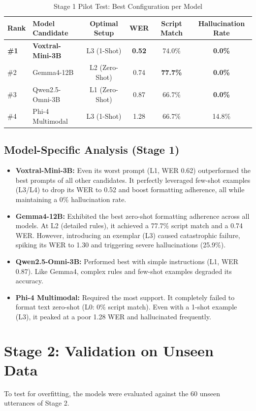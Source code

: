 \documentclass[12pt]{article}
\begin{document}
\begin{table}[H]
\centering
\caption{Stage 1 Pilot Test: Best Configuration per Model}
\begin{tabularx}{\textwidth}{@{} l X c c c c @{}}
\toprule
\textbf{Rank} & \textbf{Model Candidate} & \textbf{Optimal Setup} & \textbf{WER} & \textbf{Script Match} & \textbf{Hallucination Rate} \\
\midrule
\textbf{\#1} & \textbf{Voxtral-Mini-3B} & L3 (1-Shot) & \textbf{0.52} & 74.0\% & \textbf{0.0\%} \\
\#2 & Gemma4-12B & L2 (Zero-Shot) & 0.74 & \textbf{77.7\%} & \textbf{0.0\%} \\
\#3 & Qwen2.5-Omni-3B & L1 (Zero-Shot) & 0.87 & 66.7\% & \textbf{0.0\%} \\
\#4 & Phi-4 Multimodal & L3 (1-Shot) & 1.28 & 66.7\% & 14.8\% \\
\bottomrule
\end{tabularx}
\end{table}

\subsection{Model-Specific Analysis (Stage 1)}
\begin{itemize}
    \item \textbf{Voxtral-Mini-3B:} Even its worst prompt (L1, WER 0.62) outperformed the best prompts of all other candidates. It perfectly leveraged few-shot examples (L3/L4) to drop its WER to 0.52 and boost formatting adherence, all while maintaining a 0\% hallucination rate.
    \item \textbf{Gemma4-12B:} Exhibited the best zero-shot formatting adherence across all models. At L2 (detailed rules), it achieved a 77.7\% script match and a 0.74 WER. However, introducing an exemplar (L3) caused catastrophic failure, spiking its WER to 1.30 and triggering severe hallucinations (25.9\%).
    \item \textbf{Qwen2.5-Omni-3B:} Performed best with simple instructions (L1, WER 0.87). Like Gemma4, complex rules and few-shot examples degraded its accuracy.
    \item \textbf{Phi-4 Multimodal:} Required the most support. It completely failed to format text zero-shot (L0: 0\% script match). Even with a 1-shot example (L3), it peaked at a poor 1.28 WER and hallucinated frequently.
\end{itemize}

\newpage
\section{Stage 2: Validation on Unseen Data}
To test for overfitting, the models were evaluated against the 60 unseen utterances of Stage 2. 
\end{document}
